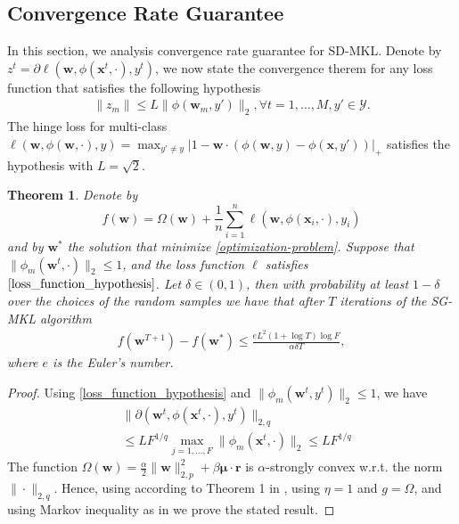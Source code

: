 \documentclass{article}
\newtheorem{theorem}{Theorem}
\begin{document}
\subsection{Convergence Rate Guarantee}
In this section, we analysis convergence rate guarantee for SD-MKL.
Denote by $z^t=\partial\ell(\mathbf{w},\phi(\mathbf{x}^t,\cdot), y^t)$,
we now state the convergence therem for any loss function that satisfies the following hypothesis
\begin{align}
\label{loss_function_hypothesis}
    \|z_m\| \leq L\|\phi(\mathbf{w}_m, y')\|_2, \forall t =1,\ldots, M, y' \in \mathcal{Y}.
\end{align}
The hinge loss for multi-class $\ell(\mathbf{w}, \phi(\mathbf{w},\cdot), y)
= \max_{y' \not =y} |1-\mathbf{w}\cdot(\phi(\mathbf{w},y)-\phi(\mathbf{x},y'))|_+$ satisfies the hypothesis with $L=\sqrt{2}$.

\begin{theorem}
Denote by $$f(\mathbf{w})=\Omega(\mathbf{w})+\frac{1}{n}\sum_{i=1}^n\ell(\mathbf{w},\phi(\mathbf{x}_i,\cdot),y_i)$$
and by $\mathbf{w}^\ast$ the solution that minimize \eqref{optimization-problem}.
Suppose that $\|\phi_m(\mathbf{w}^t,\cdot)\|_2 \leq 1$, and the loss function $\ell$ satisfies $\eqref{loss_function_hypothesis}$.
Let $\delta \in (0,1)$, then with probability at least $1 - \delta$ over the choices of the random samples
we have that after $T$ iterations of the SG-MKL algorithm
\begin{align*}
    f(\mathbf{w}^{T+1})-f(\mathbf{w^\ast}) \leq \frac{eL^2(1+\log T)\log F}{\alpha\delta T},
\end{align*}
where $e$ is the Euler's number.
\end{theorem}
\begin{proof}
Using \eqref{loss_function_hypothesis} and $\|\phi_m(\mathbf{w}^t, y^t)\|_2 \leq 1$, we have
\begin{align*}
    &\|\partial(\mathbf{w}^t,\phi(\mathbf{x}^t,\cdot), y^t)\|_{2,q} \\
    &\leq LF^{1/q} \max_{j=1, \ldots, F} \|\phi_m(\mathbf{x}^t, \cdot)\|_2 \leq LF^{1/q}
\end{align*}
The function $\Omega(\mathbf{w})=\frac{\alpha}{2}\|\mathbf{w}\|_{2,p}^2 + \beta\mathbf{\mu} \cdot \mathbf{r}$ is
 $\alpha$-strongly convex w.r.t. the norm $\|\cdot\|_{2,q}$. Hence, using according to Theorem 1 in \cite{Shalev-ShwartzSS07},
 using $\eta=1$ and $g=\Omega$, and using Markov inequality as in \cite{Shalev-ShwartzSS07} we prove the stated result.
\end{proof}
\end{document}
